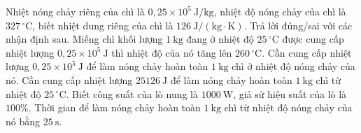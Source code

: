 \begin{ex}
Nhiệt nóng chảy riêng của chì là $0{,}25\times10^5\ \mathrm{J/kg}$, nhiệt độ nóng chảy của chì là $327\,^{\circ}\mathrm{C}$, biết nhiệt dung riêng của chì là $126\ \mathrm{J/(kg\cdot K)}$. Trả lời đúng/sai với các nhận định sau.
\choiceTF
{Miếng chì khối lượng $1\ \mathrm{kg}$ đang ở nhiệt độ $25\,^{\circ}\mathrm{C}$ được cung cấp nhiệt lượng $0{,}25\times10^5\ \mathrm{J}$ thì nhiệt độ của nó tăng lên $260\,^{\circ}\mathrm{C}$.}
{\True Cần cung cấp nhiệt lượng $0{,}25\times10^5\ \mathrm{J}$ để làm nóng chảy hoàn toàn $1\ \mathrm{kg}$ chì ở nhiệt độ nóng chảy của nó.}
{Cần cung cấp nhiệt lượng $25126\ \mathrm{J}$ để làm nóng chảy hoàn toàn $1\ \mathrm{kg}$ chì từ nhiệt độ $25\,^{\circ}\mathrm{C}$.}
{\True Biết công suất của lò nung là $1000\ \mathrm{W}$, giả sử hiệu suất của lò là $100\%$. Thời gian để làm nóng chảy hoàn toàn $1\ \mathrm{kg}$ chì từ nhiệt độ nóng chảy của nó bằng $25\ \mathrm{s}$.}
\end{ex}

